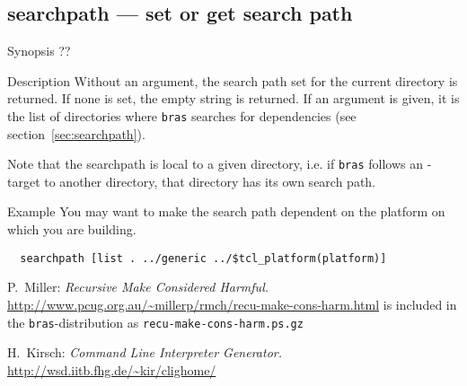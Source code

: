 \documentclass[11pt,bibtotoc,idxtotoc]{scrreprt}
\newcommand{\bras}{\texttt{bras}}
\begin{document}
\subsection{searchpath --- set or get search path}
\begin{Describe}
\item[Synopsis]  ??
\item[Description] Without an argument, the search path set for the
  current directory is returned. If none is set, the empty string is
  returned. If an argument is given, it is the list of directories
  where \bras{} searches for dependencies (see
  section~\ref{sec:searchpath}). 

  Note that the searchpath is local to a given directory, i.e. if
  \bras{} follows an -target to another directory, that
  directory has its own search path.
\item[Example]
You may want to make the search path dependent on the platform on
which you are building.
\begin{verbatim}
  searchpath [list . ../generic ../$tcl_platform(platform)]
\end{verbatim}
\end{Describe}

\begin{thebibliography}{9}

P.~Miller:
\textit{Recursive Make Considered Harmful.} 
\href{http://www.pcug.org.au/~millerp/rmch/recu-make-cons-harm.html}{http://www\hspace{0pt}.pcug\hspace{0pt}.org\hspace{0pt}.au/\~{}millerp/rmch/recu-make-cons-harm.html}
is included in the \bras-distribution as
\texttt{recu-make-cons-harm.ps.gz}

H.~Kirsch:
\textit{Command Line Interpreter Generator.}
  \href{http://wsd.iitb.fhg.de/~kir/clighome/}{http://wsd.iitb\hspace{0pt}.fhg.de/\~{}kir\hspace{0pt}/clighome/}

\end{thebibliography}

\printindex
\end{document}
